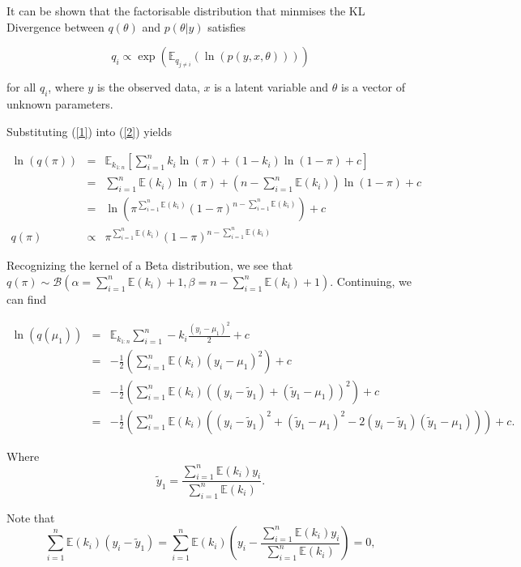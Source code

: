 \documentclass[12pt]{article}
\begin{document}
It can be shown that the factorisable distribution that minmises the KL Divergence between $q(\theta)$ and $p(\theta|y)$ satisfies

\begin{equation}
\label{2}
q_{i} \propto \exp (\mathbb{E}_{q_{j \neq i}} (\ln(p(y, x, \theta))))
\end{equation}

for all $q_{i}$, where $y$ is the observed data, $x$ is a latent variable and $\theta$ is a vector of unknown parameters.

Substituting (\ref{1}) into (\ref{2}) yields

\begin{eqnarray*}
\ln(q(\pi)) & = & \mathbb{E}_{k_{1:n}} \left[ \sum_{i=1}^{n} k_i \ln(\pi) + (1-k_i) \ln(1-\pi) + c \right] \\
& = & \sum_{i=1}^{n} \mathbb{E}(k_i) \ln (\pi) + (n- \sum_{i=1}^{n}\mathbb{E}(k_i)) \ln(1-\pi) + c \\
& = & \ln(\pi^{\sum_{i=1}^{n}\mathbb{E}(k_i)}(1-\pi)^{n-\sum_{i=1}^{n}\mathbb{E}(k_i)}) + c\\
q(\pi) & \propto & \pi^{\sum_{i=1}^{n}\mathbb{E}(k_i)}(1-\pi)^{n-\sum_{i=1}^{n}\mathbb{E}(k_i)} 
\end{eqnarray*}

Recognizing the kernel of a Beta distribution, we see that $q(\pi) \sim  \mathcal{B} (\alpha = \sum_{i=1}^{n} \mathbb{E}(k_i)+1, \beta = n-\sum_{i=1}^{n}\mathbb{E}(k_i) + 1)$. Continuing, we can find

\begin{eqnarray*}
\ln(q(\mu_1)) & = & \mathbb{E}_{k_{1:n}} \sum_{i=1}^{n} -k_i \frac{(y_i-\mu_1)^2}{2} + c  \\
& = & -\frac{1}{2} \left(\sum_{i=1}^{n}\mathbb{E}(k_i) (y_i-\mu_{1})^2\right) + c \\ 
& = & -\frac{1}{2}\left(\sum_{i=1}^{n}\mathbb{E}(k_i) ((y_i - \tilde{y}_1) + (\tilde{y}_1 - \mu_1))^2 \right)+ c \\
& = & -\frac{1}{2}\left(\sum_{i=1}^{n}\mathbb{E}(k_i) ((y_i - \tilde{y}_1)^2 + (\tilde{y}_1 - \mu_1)^2 - 2(y_i - \tilde{y}_1)(\tilde{y}_1 - \mu_1))\right) + c.
\end{eqnarray*}

Where
$$\tilde{y}_1 = \frac{\sum_{i=1}^{n} \mathbb{E}(k_i)y_i}{\sum_{i=1}^{n} \mathbb{E}(k_i)}.$$

Note that
$$\sum_{i=1}^{n}\mathbb{E}(k_i)(y_i - \tilde{y}_1) = \sum_{i=1}^{n}\mathbb{E}(k_i)\left(y_i - \frac{\sum_{i=1}^{n} \mathbb{E}(k_i)y_i}{\sum_{i=1}^{n} \mathbb{E}(k_i)}\right) = 0,$$
\end{document}
